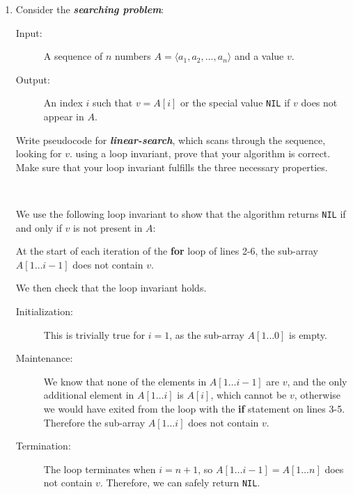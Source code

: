 \documentclass[Chapter02]{subfiles}
\begin{document}
\begin{enumerate}[leftmargin=\labelsep]
		\item \label{exer:ch02-linear-search} Consider the \textbf{\textit{searching problem}}:
		\begin{description}
			\item[Input:] A sequence of $n$ numbers $A = \langle a_1, a_2, \dots, a_n \rangle$ and a value $v$.
			\item[Output:] An index $i$ such that $v = A[i]$ or the special value \texttt{NIL} if $v$ does not appear in $A$.
		\end{description}
		Write pseudocode for \textbf{\textit{linear-search}}, which scans through the sequence, looking for $v$. using a loop invariant, prove that your algorithm is correct. Make sure that your loop invariant fulfills the three necessary properties.
		\begin{answer}
			\hfill\\
			\begin{algorithm}[H]

			\end{algorithm}
			We use the following loop invariant to show that the algorithm returns \texttt{NIL} if and only if $v$ is not present in $A$:

			\begin{addmargin}[2em]{2em}
				At the start of each iteration of the \textbf{for} loop of lines 2-6, the sub-array $A[1 \dots i - 1]$ does not contain $v$.
			\end{addmargin}

			We then check that the loop invariant holds.

			\begin{description}
				\item[Initialization:] This is trivially true for $i = 1$, as the sub-array $A[1 \dots 0]$ is empty.

				\item[Maintenance:] We know that none of the elements in $A[1 \dots i - 1]$ are $v$, and the only additional element in $A[1 \dots i]$ is $A[i]$, which cannot be $v$, otherwise we would have exited from the loop with the \textbf{if} statement on lines 3-5. Therefore the sub-array $A[1 \dots i]$ does not contain $v$.

				\item[Termination:] The loop terminates when $i = n + 1$, so $A[1 \dots i - 1] = A[1 \dots n]$ does not contain $v$. Therefore, we can safely return \texttt{NIL}.
			\end{description}
			

\end{answer}
\end{enumerate}
\end{document}
